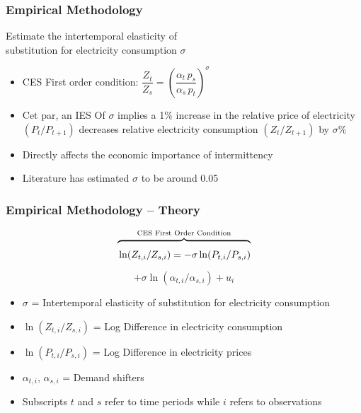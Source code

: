 \documentclass[aspectratio=169]{beamer}
\newcommand{\xoverbrace}[2][\vphantom{\dfrac{A}{A}}]{\overbrace{#1#2}}
\begin{document}
\begin{frame}
\frametitle{Empirical Methodology}

\vspace{2em}
\begin{block}{}
	\centering \vspace{0.2em}
	Estimate the intertemporal elasticity of \\
	substitution for electricity consumption $\sigma$
\end{block}
\vspace{1em}

\begin{itemize}
	\setlength\itemsep{0.75em}
	\item <1->CES First order condition: $\dfrac{Z_t}{Z_s} = \left(\dfrac{\alpha_t \, p_s}{\alpha_s \, p_t} \right)^\sigma $
	\item <1->Cet par, an IES Of $\sigma$ implies a 1\% increase in the relative price of electricity $(P_{t}/P_{t+1})$  decreases relative electricity consumption $(Z_{t}/Z_{t+1})$  by $\sigma\%$
	\item <2->Directly affects the economic importance of intermittency
	\item <2->Literature has estimated $\sigma$ to be around 0.05 
\end{itemize}
\vspace{2.75em}

\end{frame}


\begin{frame}
\frametitle{Empirical Methodology -- Theory}



$$\xoverbrace{\ln (Z_{ t, i} / Z_{ s, i}) = -\sigma \ln (P_{t,i} / P_{s,i})}^{\text{CES First Order Condition}}$$
\vspace{-1.75em}
$$+  \sigma \ln (\alpha_{t,i} / \alpha_{s,i}) + u_i$$
\vspace{1em}
\begin{itemize}
	\setlength\itemsep{0.25em}
	\item $\sigma$ = Intertemporal elasticity of substitution for electricity consumption
	\item $\ln (Z_{t, i} / Z_{s, i})$ = Log Difference in electricity consumption
	\item $\ln (P_{t,i} / P_{s,i})$ = Log Difference in electricity prices
	\item $\alpha_{t,i},\, \alpha_{s,i}$ = Demand shifters
	\item Subscripts $t$ and $s$ refer to time periods while $i$ refers to observations
\end{itemize}
\vspace{2.75em}

\end{frame}
\end{document}
